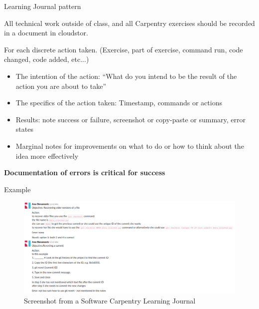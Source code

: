 \documentclass[aspectratio=43, 11pt]{beamer} %
\begin{document}
\begin{frame}{Learning Journal pattern}

All technical work outside of class, and all Carpentry exercises should be recorded in a document in cloudstor.

For each discrete action taken. (Exercise, part of exercise, command run, code changed, code added, etc...)
\begin{itemize}[label=\textbullet]
    \item The intention of the action: ``What do you intend to be the result of the action you are about to take''
    \item The specifics of the action taken: Timestamp, commands or actions
    \item Results: note success or failure, screenshot or copy-paste or summary, error states
    \item Marginal notes for improvements on what to do or how to think about the idea more effectively
\end{itemize}

\textbf{Documentation of errors is critical for success}


\end{frame}

\begin{frame}{Example}

\begin{figure}[H]
        \centering
        \includegraphics[height=.75\textheight]{figures/anaScreenshot.png}
        \caption{Screenshot from a Software Carpentry Learning Journal}
        \label{fig:screenshotAna}
    \end{figure}
    
\end{frame}
\end{document}
